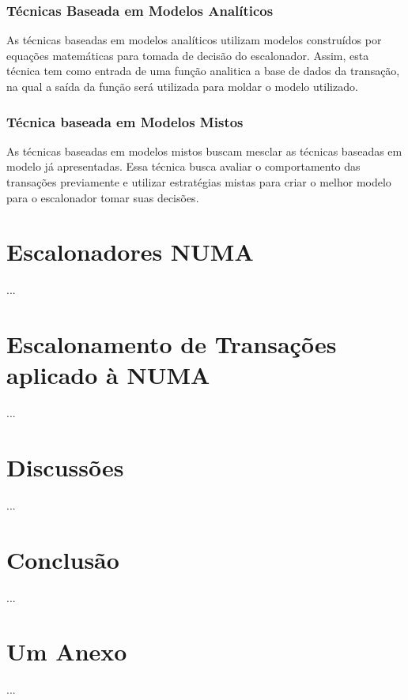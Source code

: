\documentclass[ti]{texufpel} %
\begin{document}
\subsection{Técnicas Baseada em Modelos Analíticos}

As técnicas baseadas em modelos analíticos utilizam modelos construídos por equações matemáticas para tomada de decisão do escalonador. Assim, esta técnica tem como entrada de uma função analitica a base de dados da transação, na qual a saída da função será utilizada para moldar o modelo utilizado.

\subsection{Técnica baseada em Modelos Mistos}

As técnicas baseadas em modelos mistos buscam mesclar as técnicas baseadas em modelo já apresentadas. Essa técnica busca avaliar o comportamento das transações previamente e utilizar estratégias mistas para criar o melhor modelo para o escalonador tomar suas decisões.

\chapter{Escalonadores NUMA}

  ...


\chapter{Escalonamento de Transações aplicado à NUMA}

  ...


\chapter{Discussões}

  ...


\chapter{Conclusão}

  ...





\annex
\chapter{Um Anexo}

  ...
\end{document}
